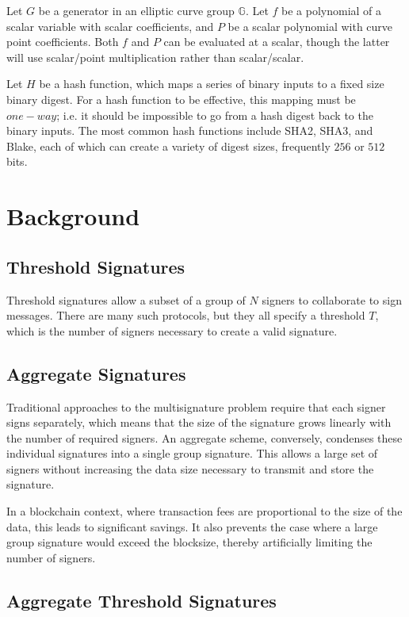 \documentclass{article}
\begin{document}
Let $G$ be a generator in an elliptic curve group $\mathbb{G}$.  Let $f$ be a polynomial of a scalar variable with scalar coefficients, and $P$ be a scalar polynomial with curve point coefficients.  Both $f$ and $P$ can be evaluated at a scalar, though the latter will use scalar/point multiplication rather than scalar/scalar.

Let $H$ be a hash function, which maps a series of binary inputs to a fixed size binary digest.  For a hash function to be effective, this mapping must be $one-way$; i.e. it should be impossible to go from a hash digest back to the binary inputs.  The most common hash functions include SHA2, SHA3, and Blake, each of which can create a variety of digest sizes, frequently $256$ or $512$ bits.

\newpage
\onecolumn
\section{
  Background
}

\subsection{
  Threshold Signatures
}

Threshold signatures allow a subset of a group of $N$ signers to collaborate to sign messages.  There are many such protocols, but they all specify a threshold $T$, which is the number of signers necessary to create a valid signature.  

\subsection{
  Aggregate Signatures
}

Traditional approaches to the multisignature problem require that each signer signs separately, which means that the size of the signature grows linearly with the number of required signers.  An aggregate scheme, conversely, condenses these individual signatures into a single group signature.  This allows a large set of signers without increasing the data size necessary to transmit and store the signature.

In a blockchain context, where transaction fees are proportional to the size of the data, this leads to significant savings.  It also prevents the case where a large group signature would exceed the blocksize, thereby artificially limiting the number of signers.

\subsection{
  Aggregate Threshold Signatures
}
\end{document}
